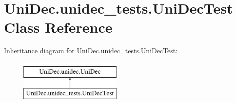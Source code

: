 \hypertarget{class_uni_dec_1_1unidec__tests_1_1_uni_dec_test}{}\section{Uni\+Dec.\+unidec\+\_\+tests.\+Uni\+Dec\+Test Class Reference}
\label{class_uni_dec_1_1unidec__tests_1_1_uni_dec_test}
Inheritance diagram for Uni\+Dec.\+unidec\+\_\+tests.\+Uni\+Dec\+Test\+:\begin{figure}[H]
\begin{center}
\leavevmode
\includegraphics[height=2.000000cm]{class_uni_dec_1_1unidec__tests_1_1_uni_dec_test}
\end{center}
\end{figure}
